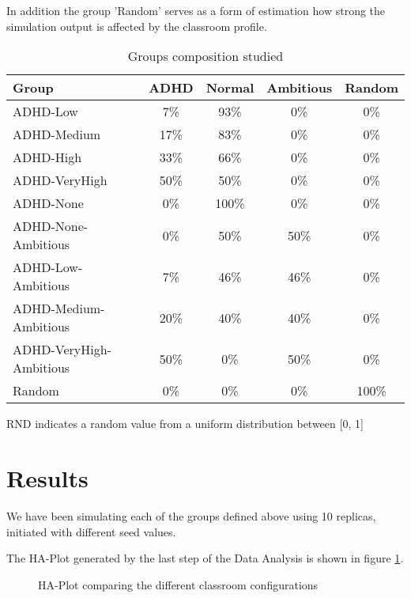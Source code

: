 In addition the group 'Random' serves as a form of estimation how strong the simulation
output is affected by the classroom profile.

\begin{table}[h!]
    \centering
    \begin{tabular}{|l|c|c|c|c|} 
        \hline
        \textbf{Group} & \textbf{ADHD} & \textbf{Normal} & \textbf{Ambitious} &  \textbf{Random} \\
        \hline
        \hline
        ADHD-Low & 7\% & 93\% & 0\% & 0\% \\
        \hline
        ADHD-Medium & 17\% & 83\% & 0\% & 0\% \\
        \hline
        ADHD-High & 33\% & 66\% & 0\% & 0\% \\
        \hline
        ADHD-VeryHigh & 50\% & 50\% & 0\% & 0\% \\
        \hline
        ADHD-None & 0\% & 100\% & 0\% & 0\% \\
        \hline
        ADHD-None-Ambitious & 0\% & 50\% & 50\% & 0\% \\
        \hline
        ADHD-Low-Ambitious & 7\% & 46\% & 46\% & 0\% \\
        \hline
        ADHD-Medium-Ambitious & 20\% & 40\% & 40\% & 0\%\\
        \hline
        ADHD-VeryHigh-Ambitious & 50\% & 0\% & 50\% & 0\%\\
        \hline
        Random & 0\% & 0\% & 0\% & 100\% \\
        \hline
    \end{tabular}
    \caption{Groups composition studied}
    \small RND indicates a random value from a uniform distribution between [0, 1]
    \label{GroupTable}
\end{table}

\section{Results}
We have been simulating each of the groups defined above using 10 replicas, initiated
with different seed values.

The HA-Plot generated by the last step of the Data Analysis is shown in figure \ref{StudyResults}.

\begin{figure}[H]
    \caption{HA-Plot comparing the different classroom configurations}
    \label{StudyResults}
\end{figure}

